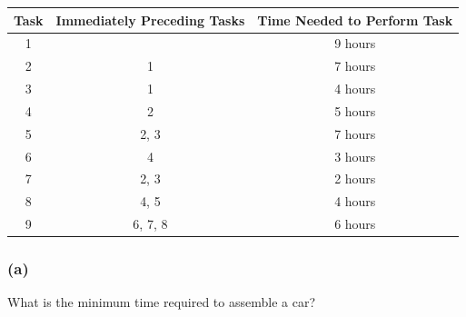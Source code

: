 \documentclass[14pt]{extarticle}
\newcommand{\cy}{\color{cyan}}
\begin{document}
\begin{center}
        \begin{tabular}{|c|c|c|}
                \hline
                {\bf \cy Task} & {\bf \cy Immediately Preceding Tasks} & {\bf \cy Time Needed to Perform Task} \\
                \hline
                1              &                                       & 9 hours                               \\
                \hline
                2              & 1                                     & 7 hours                               \\
                \hline
                3              & 1                                     & 4 hours                               \\
                \hline
                4              & 2                                     & 5 hours                               \\
                \hline
                5              & 2, 3                                  & 7 hours                               \\
                \hline
                6              & 4                                     & 3 hours                               \\
                \hline
                7              & 2, 3                                  & 2 hours                               \\
                \hline
                8              & 4, 5                                  & 4 hours                               \\
                \hline
                9              & 6, 7, 8                               & 6 hours                               \\
                \hline
        \end{tabular}
\end{center}

\subsubsection{(a)}
What is the minimum time required to assemble a car?
\end{document}
